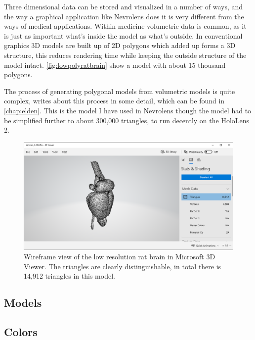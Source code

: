Three dimensional data can be stored and visualized in a number of ways, and the way a graphical application like Nevrolens does it is very different from the ways of medical applications. Within medicine volumetric data is common, as it is just as important what's inside the model as what's outside. In conventional graphics 3D models are built up of 2D polygons which added up forms a 3D structure, this reduces rendering time while keeping the outside structure of the model intact. \autoref{fig:lowpolyratbrain} show a model with about 15 thousand polygons. 

The process of generating polygonal models from volumetric models is quite complex, \citet{Elden2017} writes about this process in some detail, which can be found in \autoref{chap:elden}. This is the model I have used in Nevrolens though the model had to be simplified further to about 300,000 triangles, to run decently on the HoloLens 2.  

\begin{figure}[ht]\label{fig:lowpolyratbrain}
    \includegraphics[width=\textwidth]{fig/ratbrain_lowpoly}
    \caption{Wireframe view of the low resolution rat brain in Microsoft 3D Viewer. The triangles are clearly distinguishable, in total there is 14,912 triangles in this model. }
\end{figure}



\subsection*{Models}


\subsection*{Colors}

